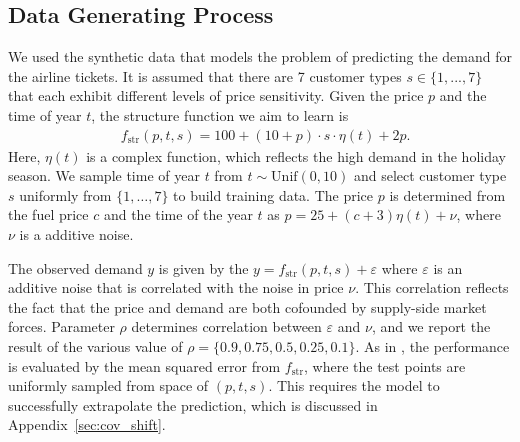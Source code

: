 \subsection{Data Generating Process} 

We used the synthetic data that models the problem of predicting the demand for the airline tickets. It is assumed that there are 7 customer types $s \in \{1,...,7\}$ that each exhibit different levels of price sensitivity. Given the price $p$ and the time of year $t$, the structure function we aim to learn is 
\begin{align*}
    &f_{\text{str}}(p, t, s) = 100 + (10 + p) \cdot s \cdot \eta(t) + 2p.
\end{align*} 
Here, $\eta(t)$ is a complex function, which reflects the high demand in the holiday season. We sample time of year $t$ from $t\sim \mathrm{Unif}(0, 10)$ and select customer type $s$ uniformly from $\{1,\dots,7\}$ to build training data. The price $p$ is determined from the fuel price $c$ and the time of the year $t$ as $p=25+(c+3)\eta(t) + \nu$, where $\nu$ is a additive noise.

The observed demand $y$ is given by the $y = f_\mathrm{str}(p,t,s) + \varepsilon$ where $\varepsilon$ is an additive noise that is correlated with the noise in price $\nu$. This correlation reflects the fact that the price and demand are both cofounded by supply-side market forces. Parameter $\rho$ determines correlation between $\varepsilon$ and $\nu$, and we report the result of the various value of $\rho =\{0.9, 0.75, 0.5, 0.25,0.1\}$. As in \citet{Singh2019,Hartford2017}, the performance is evaluated by the mean squared error from $f_\mathrm{str}$, where the test points are uniformly sampled from space of $(p,t,s)$. This requires the model to successfully extrapolate the prediction, which is discussed in Appendix~\ref{sec:cov_shift}.

